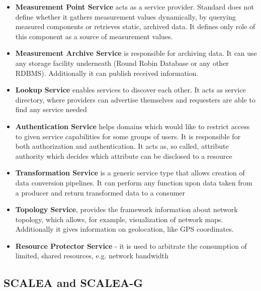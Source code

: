 \begin{itemize}

\item{ {\bf Measurement Point Service} acts as a service provider. Standard does not define whether it gathers measurement values dynamically, by querying measured components or retrieves static, archived data. It defines only role of this component as a source of measurement values.}

\item{ {\bf Measurement Archive Service} is responsible for archiving data. It can use any storage facility underneath (Round Robin Database or any other RDBMS). Additionally it can publish received information. }

\item{ {\bf Lookup Service} enables services to discover each other. It acts as service directory, where providers can advertise themselves and requesters are able to find any service needed}

\item{ {\bf Authentication Service} helps domains which would like to restrict access to given service capabilities for some groups of users. It is responsible for both authorization and authentication. It acts as, so called, attribute authority which decides which attribute can be disclosed to a resource}

\item{ {\bf Transformation Service} is a generic service type that allows creation of data conversion pipelines. It can perform any function upon data taken from a producer and return transformed data to a consumer}

\item{ {\bf Topology Service}, provides the framework information about network topology, which allows, for example, visualization of network maps. Additionally it gives information on geolocation, like GPS coordinates.}

\item{ {\bf Resource Protector Service} - it is used to arbitrate the consumption of limited, shared resources, e.g. network bandwidth} \end{itemize}


\subsection{SCALEA and SCALEA-G}

